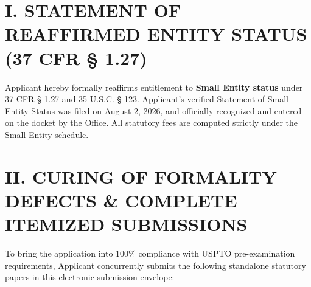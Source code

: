 \documentclass[11pt,letterpaper]{article}
\begin{document}
\section*{I. STATEMENT OF REAFFIRMED ENTITY STATUS (37 CFR \S{} 1.27)}

Applicant hereby formally reaffirms entitlement to \textbf{Small Entity status} under 37 CFR \S{} 1.27 and 35 U.S.C. \S{} 123. Applicant's verified Statement of Small Entity Status was filed on August 2, 2026, and officially recognized and entered on the docket by the Office. All statutory fees are computed strictly under the Small Entity schedule.

\section*{II. CURING OF FORMALITY DEFECTS \& COMPLETE ITEMIZED SUBMISSIONS}

To bring the application into 100\% compliance with USPTO pre-examination requirements, Applicant concurrently submits the following standalone statutory papers in this electronic submission envelope:
\end{document}

